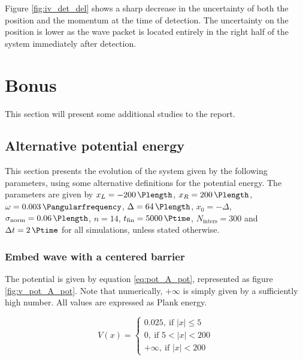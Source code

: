 \documentclass[a4paper,12pt,twoside]{article}
\begin{document}
Figure \ref{fig:iv_det_del} shows a sharp decrease in the uncertainty of both the position and the momentum at the time of detection. The uncertainty on the position is lower as the wave packet is located entirely in the right half of the system immediately after detection.


\newpage
\section{Bonus}
  This section will present some additional studies to the report.\\

  \subsection{Alternative potential energy}
    This section presents the evolution of the system given by the following parameters, using some alternative definitions for the potential energy.
    The parameters are given by $x_L=\SI{-200}{\Plength}$, $x_R=\SI{200}{\Plength}$, $\omega = \SI{0.003}{\Pangularfrequency}$, $\Delta = \SI{64}{\Plength}$, $x_0 = -\Delta$, $\sigma_\text{norm} = \SI{0.06}{\Plength}$, $n=14$, $t_\text{fin} = \SI{5000}{\Ptime}$, $N_\text{inters} = 300$ and $\Delta t = \SI{2}{\Ptime}$ for all simulations, unless stated otherwise.\\

      \subsubsection{Embed wave with a centered barrier}
        The potential is given by equation \eqref{eq:pot_A_pot}, represented as figure \ref{fig:v_pot_A_pot}.
        Note that numerically, $+\infty$ is simply given by a sufficiently high number.
        All values are expressed as Plank energy.

        \begin{equation}
          V(x) =
          \begin{cases}
            0.025,~\text{if $|x| \leq 5$}\\
            0,~\text{if $5 < |x| < 200$}\\
            +\infty,~\text{if $|x| < 200$}
          \end{cases}
          \label{eq:pot_A_pot}
        \end{equation}
\end{document}
